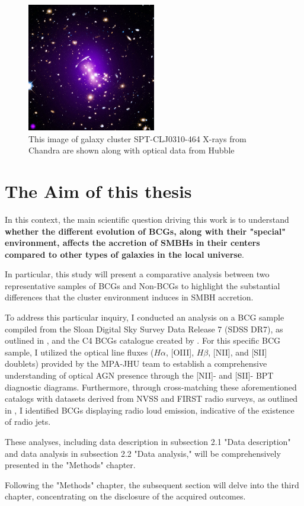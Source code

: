 \begin{figure}[t]
  \centering
  \includegraphics[width=0.5\textwidth]{BCG}
  \caption{This image of galaxy cluster SPT-CLJ0310-464
  X-rays from Chandra are shown along with optical data from Hubble}
  \label{1}
\end{figure}

\newpage
\section{The Aim of this thesis}
In this context, the main scientific question driving this work is to understand \textbf{whether the different evolution of BCGs, along with their "special" environment, affects the accretion of SMBHs in their centers compared to other types of galaxies in the local universe}.

In particular, this study will present a comparative analysis between two representative samples of BCGs and Non-BCGs to highlight the substantial differences that the cluster environment induces in SMBH accretion.


To address this particular inquiry, I conducted an analysis on a BCG sample compiled from the Sloan Digital Sky Survey Data Release 7 (SDSS DR7), as outlined in \cite{2009ApJS..182..543A}, and the C4 BCGs catalogue created by \cite{2005AJ....130..968M}. For this specific BCG sample, I utilized the optical line fluxes ($H\alpha$, [OIII], $H\beta$, [NII], and [SII] doublets) provided by the MPA-JHU team to establish a comprehensive understanding of optical AGN presence through the [NII]- and [SII]- BPT diagnostic diagrams. Furthermore, through cross-matching these aforementioned catalogs with datasets derived from NVSS and FIRST radio surveys, as outlined in \cite{2005MNRAS.362....9B}, I identified BCGs displaying radio loud emission, indicative of the existence of radio jets.

These analyses, including data description in subsection 2.1 "Data description" and data analysis in subsection 2.2 "Data analysis," will be comprehensively presented in the "Methods" chapter. 

Following the "Methods" chapter, the subsequent section will delve into the third chapter, concentrating on the disclosure of the acquired outcomes.

